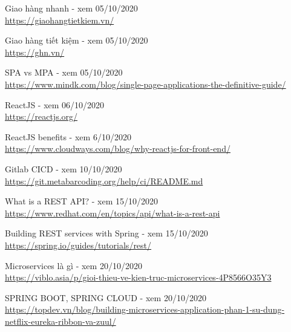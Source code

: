 \documentclass[12pt,a4paper,oneside]{book}
\begin{document}
	\frontmatter
	
	
	

	\tableofcontents
	\listoffigures
	\newpage
	
	\mainmatter
	
	
	
    
    
    
    
    
    
    \begin{thebibliography}{80}
        
         Giao hàng nhanh - xem 05/10/2020\\
        \url{https://giaohangtietkiem.vn/}
        
         Giao hàng tiết kiệm - xem 05/10/2020\\
        \url{https://ghn.vn/}
    
         SPA vs MPA - xem 05/10/2020\\
        \url{https://www.mindk.com/blog/single-page-applications-the-definitive-guide/}
        
         ReactJS - xem 06/10/2020\\
        \url{https://reactjs.org/}
    
         ReactJS benefits - xem 6/10/2020\\
        \url{https://www.cloudways.com/blog/why-reactjs-for-front-end/}
    
         Gitlab CICD - xem 10/10/2020\\
        \url{https://git.metabarcoding.org/help/ci/README.md}    
        
         What is a REST API? - xem 15/10/2020\\
        \url{https://www.redhat.com/en/topics/api/what-is-a-rest-api} 
        
        \bibitem{} Building REST services with Spring - xem 15/10/2020\\
        \url{https://spring.io/guides/tutorials/rest/} 
        
         Microservices là gì - xem 20/10/2020\\
        \url{https://viblo.asia/p/gioi-thieu-ve-kien-truc-microservices-4P8566O35Y3} 
        
         SPRING BOOT, SPRING CLOUD - xem 20/10/2020\\
        \url{https://topdev.vn/blog/building-microservices-application-phan-1-su-dung-netflix-eureka-ribbon-va-zuul/}
        

\end{thebibliography}
\end{document}

